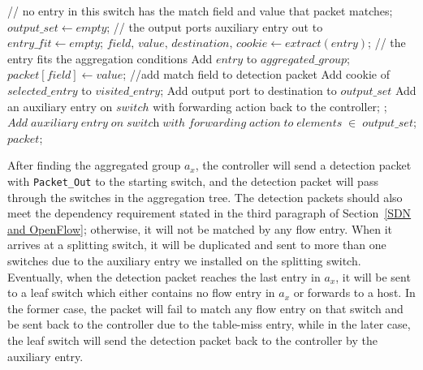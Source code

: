 \begin {tcolorbox}[blanker,float=tbp,
grow to left by=1cm, grow to right by=1cm]
\begin{algorithm}[H]
  \begin{algorithmic}[1]
      \State // no entry in this switch has the match field and value that packet matches;
      \State $\textit{output\_set} \gets empty$;  //  the output ports auxiliary entry out to
      \State $\textit{entry\_fit} \gets empty$; 
        \State $\textit{field, value, destination, cookie} \gets extract(\textit{entry})$;
          //  the entry fits the aggregation conditions
          \State Add $entry$ to $aggregated\_group$;
          \State $\textit{packet}[\textit{field}] \gets \textit{value}$;  //add match field to detection packet
          \State Add cookie of $selected\_entry$ to $visited\_entry$;
          \State Add output port to destination to $output\_set$
            \State Add an auxiliary entry on $switch$ with forwarding action back to the controller;
          \EndIf
          \State {}; 
        \EndIf
      \EndFor
        \State $Add\;auxiliary\;entry\;on\;\textit{switch}\;with\;forwarding\;action\;to\;elements\;\in\;
        \textit{output\_set}$;
      \EndIf
      \State \Return $packet$;
    \EndFunction
\end{algorithmic}
\end{algorithm}
\end{tcolorbox}

After finding the aggregated group $a_x$, the controller will send a detection packet with \texttt{Packet\_Out} to the starting switch, and the detection packet will pass through the switches in the aggregation tree. The detection packets should also meet the dependency requirement stated in the third paragraph of Section~\ref{SDN and OpenFlow}; otherwise, it will not be matched by any flow entry. When it arrives at a splitting switch, it will be duplicated and sent to more than one switches due to the auxiliary entry we installed on the splitting switch. Eventually, when the detection packet reaches the last entry in $a_x$, it will be sent to a leaf switch which either contains no flow entry in $a_x$ or forwards to a host. In the former case, the packet will fail to match any flow entry on that switch and be sent back to the controller due to the table-miss entry, while in the later case, the leaf switch will send the detection packet back to the controller by the auxiliary entry. 

